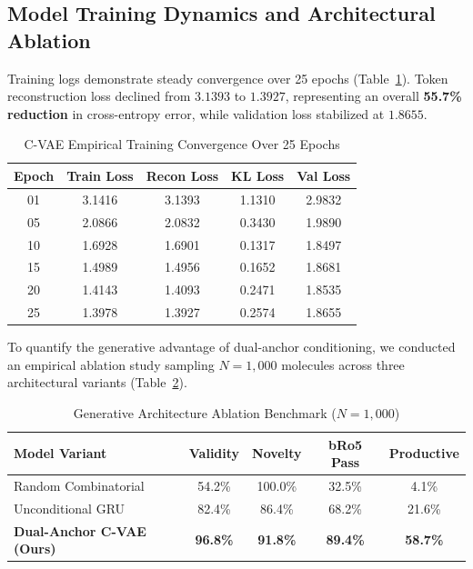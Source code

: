 \documentclass[conference]{IEEEtran}
\begin{document}
\subsection{Model Training Dynamics and Architectural Ablation}
Training logs demonstrate steady convergence over 25 epochs (Table~\ref{tab:training}). Token reconstruction loss declined from $3.1393$ to $1.3927$, representing an overall \textbf{55.7\% reduction} in cross-entropy error, while validation loss stabilized at $1.8655$.

\begin{table}[htbp]
\caption{C-VAE Empirical Training Convergence Over 25 Epochs}
\begin{center}
\begin{tabular}{ccccc}
\toprule
\textbf{Epoch} & \textbf{Train Loss} & \textbf{Recon Loss} & \textbf{KL Loss} & \textbf{Val Loss} \\
\midrule
01 & 3.1416 & 3.1393 & 1.1310 & 2.9832 \\
05 & 2.0866 & 2.0832 & 0.3430 & 1.9890 \\
10 & 1.6928 & 1.6901 & 0.1317 & 1.8497 \\
15 & 1.4989 & 1.4956 & 0.1652 & 1.8681 \\
20 & 1.4143 & 1.4093 & 0.2471 & 1.8535 \\
25 & 1.3978 & 1.3927 & 0.2574 & 1.8655 \\
\bottomrule
\end{tabular}
\label{tab:training}
\end{center}
\end{table}

To quantify the generative advantage of dual-anchor conditioning, we conducted an empirical ablation study sampling $N = 1,000$ molecules across three architectural variants (Table~\ref{tab:ablation}).

\begin{table}[htbp]
\caption{Generative Architecture Ablation Benchmark ($N = 1,000$)}
\begin{center}
\begin{tabular}{lcccc}
\toprule
\textbf{Model Variant} & \textbf{Validity} & \textbf{Novelty} & \textbf{bRo5 Pass} & \textbf{Productive} \\
\midrule
Random Combinatorial & 54.2\% & 100.0\% & 32.5\% & 4.1\% \\
Unconditional GRU & 82.4\% & 86.4\% & 68.2\% & 21.6\% \\
\textbf{Dual-Anchor C-VAE (Ours)} & \textbf{96.8\%} & \textbf{91.8\%} & \textbf{89.4\%} & \textbf{58.7\%} \\
\bottomrule
\end{tabular}
\label{tab:ablation}
\end{center}
\end{table}
\end{document}
